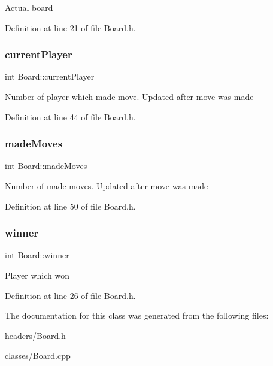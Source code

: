 Actual board 

Definition at line 21 of file Board.\+h.

\mbox{\label{classBoard_a86b952cc745c2bd392f74434653457d3}} 
\subsubsection{\texorpdfstring{current\+Player}{currentPlayer}}
{\footnotesize\ttfamily int Board\+::current\+Player\hspace{0.3cm}{\ttfamily [private]}}

Number of player which made move. Updated after move was made 

Definition at line 44 of file Board.\+h.

\mbox{\label{classBoard_abfd418c2974974039da3fff24ad5c185}} 
\subsubsection{\texorpdfstring{made\+Moves}{madeMoves}}
{\footnotesize\ttfamily int Board\+::made\+Moves\hspace{0.3cm}{\ttfamily [private]}}

Number of made moves. Updated after move was made 

Definition at line 50 of file Board.\+h.

\mbox{\label{classBoard_a67eeec840d17ab997e32234493ac7e39}} 
\subsubsection{\texorpdfstring{winner}{winner}}
{\footnotesize\ttfamily int Board\+::winner\hspace{0.3cm}{\ttfamily [private]}}

Player which won 

Definition at line 26 of file Board.\+h.



The documentation for this class was generated from the following files\+:\begin{DoxyCompactItemize}
\item 
headers/Board.\+h\item 
classes/Board.\+cpp\end{DoxyCompactItemize}
